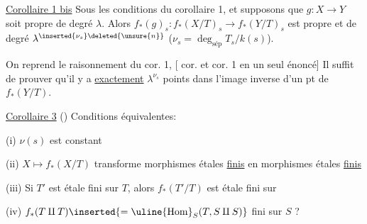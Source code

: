 
\uline{Corollaire 1 bis} Sous les conditions du corollaire 1,
  et supposons que   $g:X\to Y$ soit propre de degré  $\lambda$.
Alors $f_*(g)_s:f_*(X/T)_s\to f_*(Y/T)_s$ est propre et de degré $\lambda^{\inserted{\nu_s}\deleted{\unsure{n}}}$ ($\nu_s=\deg_{\mathrm{sép}}T_s/k(s)$).

On reprend le raisonnement du cor. 1,
[ cor.  et cor. 1 en un seul énoncé]
Il suffit de prouver qu'il y a \uline{exactement} $\lambda^{\nu_s}$ points dans l'image inverse d'un pt de $f_*(Y/T)$.

\uline{Corollaire 3} ()   Conditions équivalentes:

(i) $\nu(s)$ est  constant

(ii) $X\mapsto f_*(X/T)$ transforme morphismes  étales \uline{finis} en morphismes étales \uline{finis}

(iii) Si $T'$ est étale fini sur $T$, alors $f_*(T'/T)$ est étale fini sur 

(iv) $f_*(T\amalg T)\inserted{=\uline{\operatorname{Hom}}_S(T,S\amalg S)}$  fini sur $S$ ?

